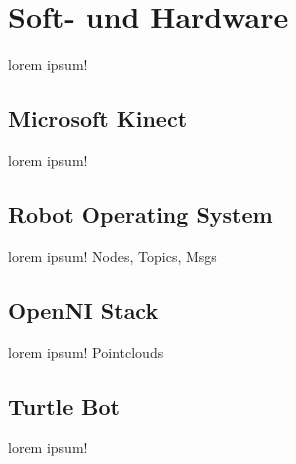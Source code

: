\section{Soft- und Hardware}
\label{sec:softundhardware}

{\color{red}lorem ipsum!}

\subsection{Microsoft Kinect}
{\color{red}lorem ipsum!}

\subsection{Robot Operating System}
{\color{red}lorem ipsum!}
Nodes, Topics, Msgs

\subsection{OpenNI Stack}
{\color{red}lorem ipsum!}
Pointclouds

\subsection{Turtle Bot}
{\color{red}lorem ipsum!}
